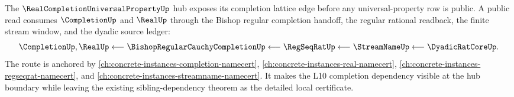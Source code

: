 The $\RealCompletionUniversalPropertyUp$ hub exposes its completion lattice edge
before any universal-property row is public. A public read consumes
$\CompletionUp$ and $\RealUp$ through the Bishop regular completion handoff,
the regular rational readback, the finite stream window, and the dyadic source
ledger:
$$
\CompletionUp,\RealUp
\longleftarrow
\BishopRegularCauchyCompletionUp
\longleftarrow
\RegSeqRatUp
\longleftarrow
\StreamNameUp
\longleftarrow
\DyadicRatCoreUp .
$$
The route is anchored by
\autoref{ch:concrete-instances-completion-namecert},
\autoref{ch:concrete-instances-real-namecert},
\autoref{ch:concrete-instances-regseqrat-namecert}, and
\autoref{ch:concrete-instances-streamname-namecert}. It makes the L10
completion dependency visible at the hub boundary while leaving the existing
sibling-dependency theorem as the detailed local certificate.
